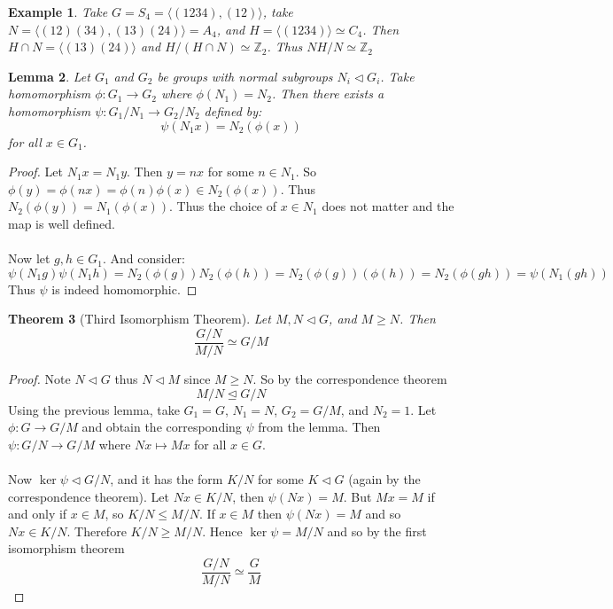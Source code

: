 \documentclass[a4paper,10pt]{article}
\newcommand{\ZZ}{\mathbb{Z}}
\newtheorem{thm}{Theorem}
\newtheorem{eg}[thm]{Example}
\newtheorem{Lem}[thm]{Lemma}
\begin{document}
\begin{eg}
Take $G = S_4 = \langle (1234), (12) \rangle$, take $N = \langle (12)(34), (13)(24) \rangle = A_4$, and $H = \langle (1234) \rangle \simeq C_4$. Then $H \cap N = \langle (13)(24) \rangle$ and  $H / (H \cap N) \simeq \ZZ_2$. Thus $NH / N \simeq \ZZ_2$
\end{eg}


\begin{Lem}
Let $G_1$ and $G_2$ be groups with normal subgroups $N_i \triangleleft G_i$. Take homomorphism $\phi : G_1 \rightarrow G_2$ where $\phi(N_1) = N_2$. Then there exists a homomorphism $\psi : G_1 / N_1 \rightarrow G_2 / N_2$ defined by:
\[ \psi (N_1x) = N_2(\phi(x)) \]
for all $x \in G_1$.   
\end{Lem}

\begin{proof}
Let $N_1 x = N_1 y$. Then $y = nx$ for some $n \in N_1$. So $\phi(y) = \phi(nx) = \phi(n)\phi(x) \in N_2 (\phi(x))$. Thus $N_2(\phi(y)) = N_1(\phi(x))$. Thus the choice of $x \in N_1$ does not matter and the map is well defined. \\
\\
Now let $g,h \in G_1$. And consider:
\[ \psi(N_1 g)\psi (N_1 h)= N_2(\phi(g)) N_2(\phi(h)) = N_2(\phi(g))(\phi(h)) = N_2(\phi(gh)) = \psi(N_1(gh)) \]
Thus $\psi$ is indeed homomorphic. 
\end{proof}

\begin{thm}[Third Isomorphism Theorem]
Let $M, N \triangleleft G$, and $M \geq N$. Then 
\[ \frac{G/N}{M / N} \simeq G / M \]
\end{thm}


\begin{proof}
Note $N \triangleleft G$ thus $N \triangleleft M$ since $M \geq N$. So by the correspondence theorem
\[ M / N \trianglelefteq G / N \]
Using the previous lemma, take $G_1 = G$, $N_1 = N$, $G_2 = G / M$, and $N_2 = 1$. Let $\phi : G \rightarrow G / M$ and obtain the corresponding $\psi$ from the lemma. Then $\psi : G / N \rightarrow G / M$ where $Nx \mapsto Mx$ for all $x \in G$. \\
\\
Now $\ker \psi \triangleleft G / N$, and it has the form $K / N$ for some $K \triangleleft G$ (again by the correspondence theorem). Let $Nx \in K / N$, then $\psi (Nx)  = M$. But $Mx = M$ if and only if $x \in M$, so $K / N \leq M / N$.  If $x \in M$ then $\psi (Nx) = M$ and so $Nx \in K / N$. Therefore $K / N \geq M / N$. Hence $\ker \psi  = M/ N$ and so by the first isomorphism theorem \[ \frac{G / N}{M / N} \simeq \frac{G}{M} \]

\end{proof}
\end{document}
